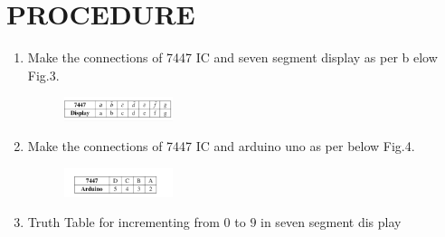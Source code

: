 \documentclass[conference]{IEEEtran}
\begin{document}
	\section{PROCEDURE}


	\begin{enumerate}
	\item Make the connections of 7447 IC and seven segment display as per b
	elow Fig.3.                                                                     \begin{figure}[h]                                                       \centering
	        \includegraphics[width=0.3\textwidth]{image1.jpg}
		        \caption{\label{fig-3:Gates}}
			\end{figure}

			\item Make the connections of 7447 IC and arduino uno as per below Fig.4.
			\begin{figure}[h]
			\centering
			\includegraphics[width=0.3\textwidth] {image2.jpg}
			\caption{\label{fig-4:Gates}}
			\end{figure}

			\item {Truth Table for incrementing from $0$ to $9$ in seven segment dis
			play }
			        \vspace{0.4cm}


\end{enumerate}
\end{document}
